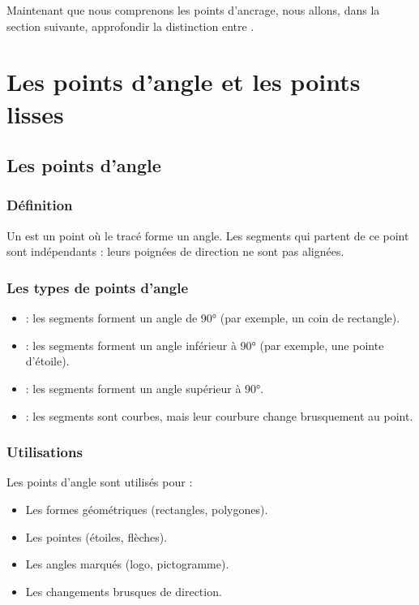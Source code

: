 Maintenant que nous comprenons les points d'ancrage, nous allons, dans la section suivante, approfondir la distinction entre .

\section{Les points d'angle et les points lisses}

\subsection{Les points d'angle}

\subsubsection{Définition}

Un  est un point où le tracé forme un angle. Les segments qui partent de ce point sont indépendants : leurs poignées de direction ne sont pas alignées.

\subsubsection{Les types de points d'angle}

\begin{itemize}
    \item {} : les segments forment un angle de 90° (par exemple, un coin de rectangle).
    \item {} : les segments forment un angle inférieur à 90° (par exemple, une pointe d'étoile).
    \item {} : les segments forment un angle supérieur à 90°.
    \item {} : les segments sont courbes, mais leur courbure change brusquement au point.
\end{itemize}

\subsubsection{Utilisations}

Les points d'angle sont utilisés pour :

\begin{itemize}
    \item Les formes géométriques (rectangles, polygones).
    \item Les pointes (étoiles, flèches).
    \item Les angles marqués (logo, pictogramme).
    \item Les changements brusques de direction.
\end{itemize}

